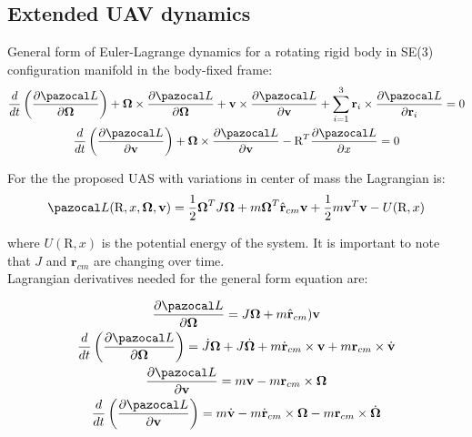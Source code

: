 \subsection{Extended UAV dynamics}

General form of Euler-Lagrange dynamics for a rotating rigid body in SE(3) configuration manifold in the body-fixed frame:
\begin{gather}
	\frac{d}{dt} \left( \frac{\partial \La}{\partial \mb{\Omega}} \right)
	+ \mb{\Omega} \times \frac{\partial \La}{\partial \mb{\Omega}} 
	+ \textbf{v} \times \frac{\partial \La}{\partial \textbf{v}} 
	+ \sum_{i=1}^{3} \textbf{r}_i \times \frac{\partial \La}{\partial \textbf{r}_i} = 0 \label{general1}\\
	\frac{d}{dt} \left( \frac{\partial \La}{\partial \textbf{v}} \right)
	+ \mb{\Omega} \times \frac{\partial \La}{\partial \textbf{v}} 
	- \text{R}^T \frac{\partial \La}{\partial x} = 0 \label{general2}
\end{gather}

For the the proposed UAS with variations in center of mass the Lagrangian is:
\begin{equation}
	\La(\text{R},x,\mb{\Omega},\textbf{v}) = \frac{1}{2}\mb{\Omega}^TJ\mb{\Omega} + m \mb{\Omega}^T \hat{\textbf{r}}_{cm}\textbf{v} + \frac{1}{2}m\textbf{v}^T\textbf{v} - U(\text{R},x)
\end{equation}

\noindent where $U(\text{R},x)$ is the potential energy of the system. It is important to note that $J$ and $\textbf{r}_{cm}$ are changing over time. \\
Lagrangian derivatives needed for the general form equation are:

\begin{gather}
	\frac{\partial \La}{\partial \mb{\Omega}} = J\mb{\Omega} + m \hat{\textbf{r}}_{cm})\textbf{v} \label{d1}\\ 
	\frac{d}{dt} \left( \frac{\partial \La}{\partial \mb{\Omega}} \right) = \dot{J} \mb{\Omega} + J \dot{\mb{\Omega}} + m \dot{\textbf{r}}_{cm} \times \textbf{v} + m \textbf{r}_{cm} \times \dot{\textbf{v}} \label{d2}\\ 
	\frac{\partial \La}{\partial \textbf{v}} = m\textbf{v} - m\textbf{r}_{cm} \times \mb{\Omega} \label{d3}\\ 
	\frac{d}{dt} \left( \frac{\partial \La}{\partial \textbf{v}} \right) = m\dot{\textbf{v}} - m\dot{\textbf{r}}_{cm} \times \mb{\Omega} - m \textbf{r}_{cm} \times \dot{\mb{\Omega}} \label{d4}
\end{gather}

